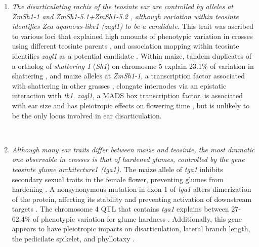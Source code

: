 \documentclass[9pt,twocolumn,twoside]{rilabRxiv}
\begin{document}
\begin{enumerate}
﻿ \item \textit{The disarticulating rachis of the teosinte ear are controlled by alleles at \textit{ZmSh1-1}%
 and \textit{ZmSh1-5.1+ZmSh1-5.2}%
 , although variation within teosinte identifies \textit{Zea agamous-like1} (\textit{zagl1}) to be a candidate.}
 This trait was ascribed to various loci that explained high amounts of phenotypic variation in crosses using different teosinte parents \citep{doebley1991, doebley1993}, and association mapping within teosinte identifies \textit{zagl1} as a potential candidate \citep{weber2008}. %
Within maize, tandem duplicates of a ortholog of \textit{shattering 1} (\textit{Sh1}) on chromosme 5 explain 23.1\% of variation in shattering \citep{lin2012}, and maize alleles at \textit{ZmSh1-1}, a transcription factor associated with shattering in other grasses \citep{lin2012}, elongate internodes via an epistatic interaction with \textit{tb1}\citep{yang2016}. %
 \textit{zagl1}, a MADS box transcription factor, is associated with ear size and has pleiotropic effects on flowering time \citep{wills2017}, but is unlikely to be the only locus involved in ear disarticulation.

﻿ \item \textit{Although many ear traits differ between maize and teosinte, the most dramatic one observable in crosses is that of hardened glumes, controlled by the gene \textit{teosinte glume architecture1} (\textit{tga1}).}
 The maize allele of \textit{tga1} inhibits secondary sexual traits in the female flower, preventing glumes from hardening \citep{preston2012}.
 A nonsynonymous mutation in exon 1 of \textit{tga1} alters dimerization of the protein, affecting its stability and preventing activation of downstream targets \citep{wang2015}.
 The chromosome 4 QTL that contains \textit{tga1}  explains between 27-62.4\% of phenotypic variation for glume hardness \citep{doebley1991, doebley1993, briggs2007}.
 Additionally, this gene appears to have pleiotropic impacts on disarticulation, lateral branch length, the pedicilate spikelet, and phyllotaxy \citep{wang2015}.


\end{enumerate}
\end{document}
